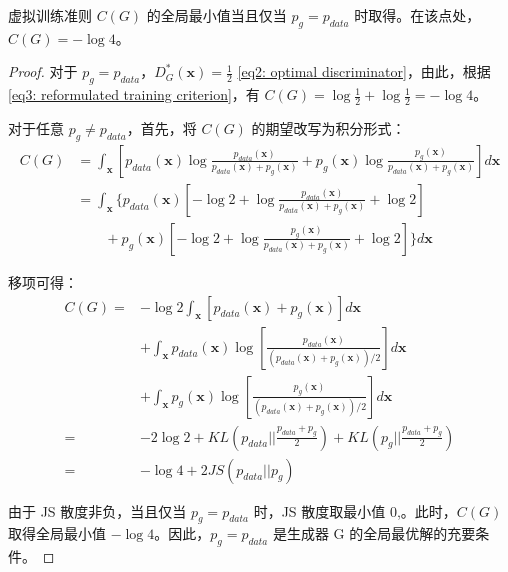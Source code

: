 \documentclass{myarticle}
\begin{document}
    \begin{theorem}
        虚拟训练准则 $C(G)$ 的全局最小值当且仅当 $p_g=p_{data}$ 时取得。在该点处，$C(G)=-\log4$。 \label{thm1: global optimality of G}
    \end{theorem}

    \begin{proof}
        对于 $p_g=p_{data}$，$D_{G}^{*}(\bm{x})=\frac{1}{2}$ \eqref{eq2: optimal discriminator}，由此，根据 \eqref{eq3: reformulated training criterion}，有 $C(G)=\log\frac{1}{2}+\log\frac{1}{2}=-\log4$。

        对于任意 $p_g\neq p_{data}$，首先，将 $C(G)$ 的期望改写为积分形式：
        \begin{equation}
            \begin{split}
                C(G)&=\int_{\bm{x}} \left [p_{data}(\bm{x})\log \frac{p_{data}(\bm{x})}{p_{data}(\bm{x})+p_g(\bm{x})}+p_g(\bm{x})\log \frac{p_g(\bm{x})}{p_{data}(\bm{x})+p_g(\bm{x})}\right ]d\bm{x} \\
                &=\int_{\bm{x}} \bigg\{p_{data}(\bm{x})\left [-\log2+\log \frac{p_{data}(\bm{x})}{p_{data}(\bm{x})+p_g(\bm{x})}+\log2 \right ] \\ 
                &\qquad +p_g(\bm{x})\left [-\log2+\log \frac{p_g(\bm{x})}{p_{data}(\bm{x})+p_g(\bm{x})}+\log2 \right ]\bigg\} d\bm{x}
            \end{split}
        \end{equation}

        移项可得：
        \begin{equation}
            \begin{split}
                C(G)=&-\log2\int_{\bm{x}}\left [p_{data}(\bm{x})+p_g(\bm{x})\right ]d\bm{x} \\
                &+\int_{\bm{x}}p_{data}(\bm{x})\log\left [ \frac{p_{data}(\bm{x})}{(p_{data}(\bm{x})+p_g(\bm{x}))/2}\right ]d\bm{x} \\
                &+\int_{\bm{x}}p_g(\bm{x})\log\left [ \frac{p_{g}(\bm{x})}{(p_{data}(\bm{x})+p_g(\bm{x}))/2}\right ]d\bm{x} \\
                =&-2\log2+KL(p_{data}||\frac{p_{data}+p_g}{2})+KL(p_g||\frac{p_{data}+p_g}{2}) \\
                =&-\log4+2JS(p_{data}||p_g)
            \end{split}
        \end{equation}

        由于 JS 散度非负，当且仅当 $p_g=p_{data}$ 时，JS 散度取最小值 0,。此时，$C(G)$ 取得全局最小值 $-\log4$。因此，$p_g=p_{data}$ 是生成器 G 的全局最优解的充要条件。
        
        \QED
    \end{proof}
\end{document}
